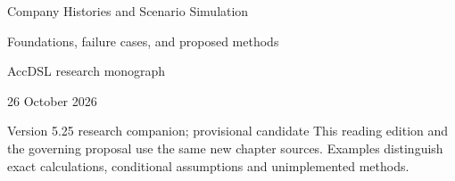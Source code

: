 \documentclass[11pt,a4paper]{report}
\begin{document}
\hypersetup{pageanchor=false}
\begin{titlepage}
{\Huge Company Histories and Scenario Simulation\par}
\vspace{12mm}
{\Large Foundations, failure cases, and proposed methods\par}
\vspace{8mm}
AccDSL research monograph\par 26 October 2026\par Version 5.25 research companion; provisional candidate
\vfill
This reading edition and the governing proposal use the same new chapter sources. Examples distinguish exact calculations, conditional assumptions and unimplemented methods.
\end{titlepage}
\hypersetup{pageanchor=true}
\tableofcontents
\clearpage{}


























\clearpage\label{sim:body-end}

\begingroup\raggedright
\endgroup
\end{document}
